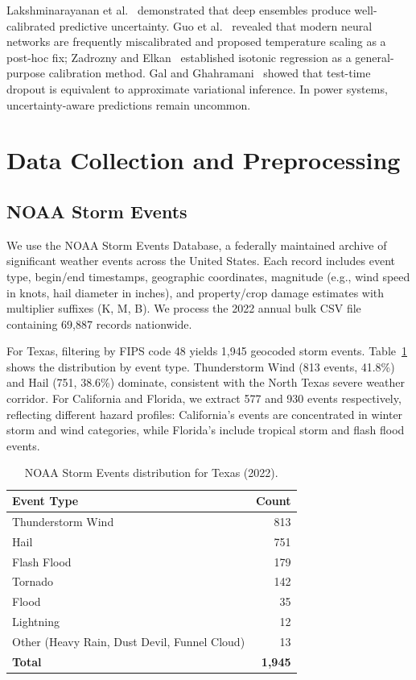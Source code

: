 \documentclass[conference]{IEEEtran}
\begin{document}
Lakshminarayanan et al.~\cite{lakshminarayanan2017simple} demonstrated that deep ensembles produce well-calibrated predictive uncertainty. Guo et al.~\cite{guo2017calibration} revealed that modern neural networks are frequently miscalibrated and proposed temperature scaling as a post-hoc fix; Zadrozny and Elkan~\cite{zadrozny2002isotonic} established isotonic regression as a general-purpose calibration method. Gal and Ghahramani~\cite{gal2016dropout} showed that test-time dropout is equivalent to approximate variational inference. In power systems, uncertainty-aware predictions remain uncommon.

\section{Data Collection and Preprocessing}\label{sec:data}

\subsection{NOAA Storm Events}

We use the NOAA Storm Events Database, a federally maintained archive of significant weather events across the United States. Each record includes event type, begin/end timestamps, geographic coordinates, magnitude (e.g., wind speed in knots, hail diameter in inches), and property/crop damage estimates with multiplier suffixes (K, M, B). We process the 2022 annual bulk CSV file containing 69{,}887 records nationwide.

For Texas, filtering by FIPS code 48 yields 1{,}945 geocoded storm events. Table~\ref{tab:events} shows the distribution by event type. Thunderstorm Wind (813 events, 41.8\%) and Hail (751, 38.6\%) dominate, consistent with the North Texas severe weather corridor. For California and Florida, we extract 577 and 930 events respectively, reflecting different hazard profiles: California's events are concentrated in winter storm and wind categories, while Florida's include tropical storm and flash flood events.

\begin{table}[t]
\centering
\caption{NOAA Storm Events distribution for Texas (2022).}
\label{tab:events}
\begin{tabular}{@{}lr@{}}
\toprule
\textbf{Event Type} & \textbf{Count} \\
\midrule
Thunderstorm Wind & 813 \\
Hail & 751 \\
Flash Flood & 179 \\
Tornado & 142 \\
Flood & 35 \\
Lightning & 12 \\
Other (Heavy Rain, Dust Devil, Funnel Cloud) & 13 \\
\midrule
\textbf{Total} & \textbf{1{,}945} \\
\bottomrule
\end{tabular}
\end{table}
\end{document}
